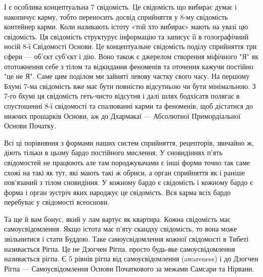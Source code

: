 І є особлива концептуальна 7 свідомість. Це свідомість що вибирає думає і
накопичує карму, тобто переносить досвід сприйняття у 8-му свідомість контейнер карми.
Коли називають істоту «той хто вибирає» мають на увазі цю свідомість.
Ця свідомість структурує інформацію та записує її в голографічний носій 8-ї
Свідомості Основи. Це концептуальне свідомість поділу сприйняття три сфери ---
об'єкт суб'єкт і дію. Воно також є джерелом створення міфічного "Я" як ототожнення
себе з тілом та відкидання феноменів та оточення кажучи постійно "це не Я". Саме
цим поділом ми зайняті левову частку свого часу. На першому Бхумі 7-ма свідомість
вже має бути повністю відсутньою чи бути мінімальною. З 7-го бхумі ця свідомість
геть-чисто відсутня і далі шлях бодхісатв полягає в спустошенні 8-ї свідомості
та спалюванні карми та феноменів, щоб дістатися до нижчих прошарків Основи,
аж до Дхармакаї --- Абсолютної Примордіальної Основи Початку.

Всі ці порівняння з формами наших систем сприйняття, рецепторів, звичайно ж,
діють тільки в цьому бардо постійного мислення. У сновидіннях п'ять свідомостей
не працюють але там породжувачами є інші форми точно так саме схожі на такі як тут,
які мають такі ж обриси, а орган сприйняття як і раніше пов'язаний з тілом сновидіння.
У кожному бардо є свідомість і кожному бардо є форма і орган зустріч яких
народжує це свідомість. Вся карма всіх бардо перебуває у свідомості всеоснови.

Та ще й вам бонус, який у лам вартує як квартира. Кожна свідомість має самоусвідомлення.
Якщо істота має п'яту скандху свідомість, то вона може звільнитися і стати Буддою.
Таке самоусвідомлення кожної свідомості в Тибеті називається Рігпа. Це не
Дзогчен Рігпа, просто будь-яке самоусвідомлення називається рігпа.
Є 5 рівнів рігпа від самоусвідомлення (awareness) і до Дзогчен Рігпа ---
Самоусвідомлення Основи Початкового за межами Самсари та Нірвани.
